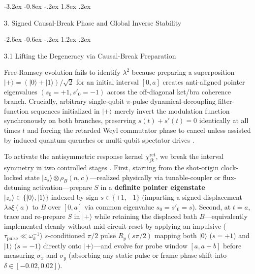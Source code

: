 \documentclass[11pt,letterpaper]{article}
\makeatletter
\renewcommand\section{\@startsection{section}{1}{\z@}%
  {-3.2ex \@plus -0.8ex \@minus -.2ex}%
  {1.8ex \@plus .2ex}%
  {\normalfont\Large\bfseries\raggedright\hyphenpenalty=10000}}
\renewcommand\subsection{\@startsection{subsection}{2}{\z@}%
  {-2.6ex \@plus -0.6ex \@minus -.2ex}%
  {1.2ex \@plus .2ex}%
  {\normalfont\large\bfseries\raggedright\hyphenpenalty=10000}}
\theoremstyle{definition}
\makeatother
\begin{document}
\section{3. Signed Causal-Break Phase and Global Inverse
Stability}\label{signed-causal-break-phase-and-global-inverse-stability}

\subsection{3.1 Lifting the Degeneracy via Causal-Break
Preparation}\label{lifting-the-degeneracy-via-causal-break-preparation}

Free-Ramsey evolution fails to identify \(\lambda^2\) because preparing
a superposition \(|+\rangle = (|0\rangle + |1\rangle)/\sqrt{2}\) for an
initial interval \([0, a]\) creates anti-aligned pointer eigenvalues
\((s_0 = +1, s'_0 = -1)\) across the off-diagonal ket/bra coherence
branch. Crucially, arbitrary single-qubit \(\pi\)-pulse
dynamical-decoupling filter-function sequences initialized in
\(|+\rangle\) merely invert the modulation function synchronously on
both branches, preserving \(s(t) + s'(t) = 0\) identically at all times
\(t\) \citep{pazSilvaViola2014, chalermpusitarak2021} and forcing the
retarded Weyl commutator phase to cancel unless assisted by induced
quantum quenches or multi-qubit spectator drives \citep{wangClerk2021}.

To activate the antisymmetric response kernel
\(\chi^{\mathrm{ret}}_{jk}\), we break the interval symmetry in two
controlled stages \citep{pollock2018prl, milzModi2021, wangClerk2021}.
First, starting from the shot-origin clock-locked state
\(|z_s\rangle \otimes \rho_B(n, c)\)---realized physically via
tunable-coupler or flux-detuning activation---prepare \(S\) in a
\textbf{definite pointer eigenstate}
\(|z_s\rangle \in \{|0\rangle, |1\rangle\}\) indexed by sign
\(s \in \{+1, -1\}\) (imparting a signed displacement
\(\lambda s \xi(a)\) to \(B\) over \([0, a]\) via common eigenvalue
\(s_0 = s'_0 = s\)). Second, at \(t = a\), trace and re-prepare \(S\) in
\(|+\rangle\) while retaining the displaced bath \(B\)---equivalently
implemented cleanly without mid-circuit reset by applying an impulsive
(\(\tau_{\mathrm{pulse}} \ll \omega_k^{-1}\)) \(s\)-conditioned
\(\pi/2\) pulse \(R_y(s\pi/2)\) mapping both \(|0\rangle\) (\(s=+1\))
and \(|1\rangle\) (\(s=-1\)) directly onto \(|+\rangle\)---and evolve
for probe window \([a, a+b]\) before measuring \(\sigma_x\) and
\(\sigma_y\) (absorbing any static pulse or frame phase shift into
\(\delta \in [-0.02, 0.02]\)).
\end{document}

